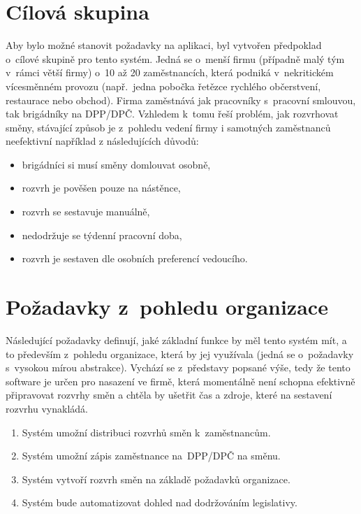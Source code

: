 \documentclass[twoside]{ctuthesis}
\begin{document}
\section{Cílová skupina}
Aby bylo možné stanovit požadavky na aplikaci, byl vytvořen předpoklad o~cílové skupině pro tento systém. Jedná se o~menší firmu (případně malý tým v~rámci větší firmy) o~10 až 20 zaměstnancích, která podniká v~nekritickém vícesměnném provozu (např.~jedna pobočka řetězce rychlého občerstvení, restaurace nebo obchod). Firma zaměstnává jak pracovníky s~pracovní smlouvou, tak brigádníky na DPP/DPČ. Vzhledem k~tomu řeší problém, jak rozvrhovat směny, stávající způsob je z~pohledu vedení firmy i samotných zaměstnanců neefektivní například z následujících důvodů:
\begin{itemize}
	\item brigádníci si musí směny domlouvat osobně,
	\item rozvrh je pověšen pouze na nástěnce,
	\item rozvrh se sestavuje manuálně,
	\item nedodržuje se týdenní pracovní doba,
	\item rozvrh je sestaven dle osobních preferencí vedoucího.
\end{itemize}


\section{Požadavky z~pohledu organizace}

Následující požadavky definují, jaké základní funkce by měl tento systém mít, a to především z~pohledu organizace, která by jej využívala (jedná se o~požadavky s~vysokou mírou abstrakce). Vychází se z~představy popsané výše, tedy že tento software je určen pro nasazení ve firmě, která momentálně není schopna efektivně připravovat rozvrhy směn a chtěla by ušetřit čas a zdroje, které na sestavení rozvrhu vynakládá.

\begin{enumerate}[label=\textbf{B\arabic*.}]
	\item Systém umožní distribuci rozvrhů směn k~zaměstnancům.
	\item Systém umožní zápis zaměstnance na~DPP/DPČ na směnu.
	\item Systém vytvoří rozvrh směn na základě požadavků organizace.
	\item Systém bude automatizovat dohled nad dodržováním legislativy.
\end{enumerate}
\end{document}
